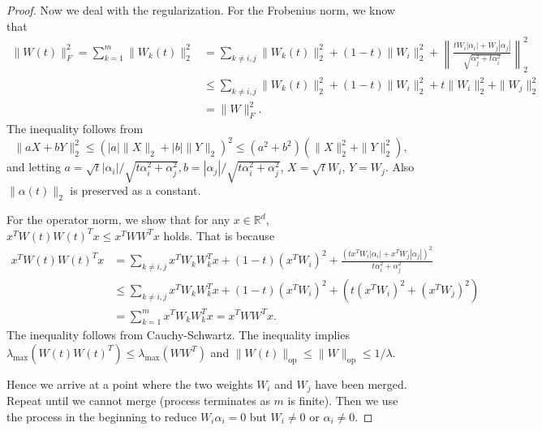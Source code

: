 \documentclass{article}
\newcommand{\op}{\mathrm{op}}
\begin{document}
\begin{proof}
Now we deal with the regularization. For the Frobenius norm, we know that
\begin{align*}
\|W(t)\|_F^2 = \sum_{k=1}^{m} \|W_k(t)\|_2^2 
&= \sum_{k\neq i,j} \|W_k(t)\|_2^2 + (1-t)\|W_i\|_2^2 + \left\|\frac{tW_i|\alpha_i|+W_j|\alpha_j|}{\sqrt{\alpha_j^2 + t\alpha_i^2}}\right\|_2^2 \\
&\leq \sum_{k \neq i,j} \|W_k(t)\|_2^2 + (1-t)\|W_i\|_2^2 + t\|W_i\|_2^2 + \|W_j\|_2^2\\
&= \|W\|_F^2.
\end{align*}
The inequality follows from
\[
\|aX+bY\|_2^2 \leq (|a|\|X\|_2 + |b|\|Y\|_2)^2 \leq (a^2+b^2)(\|X\|_2^2+\|Y\|_2^2),
\]
and letting $a = \sqrt{t}|\alpha_i|/\sqrt{t\alpha_i^2+\alpha_j^2}, b = |\alpha_j|/\sqrt{t\alpha_i^2+\alpha_j^2}$, $X = \sqrt{t}W_i$, $Y = W_j$. Also $\|\alpha(t)\|_2$ is preserved as a constant.

For the operator norm, we show that for any $x \in \mathbb{R}^{d}$, $x^{T}W(t)W(t)^{T}x \leq x^{T}WW^{T}x$ holds. That is because 
\begin{align*}
x^{T}W(t)W(t)^{T}x &= \sum_{k \neq i,j}x^{T}W_kW_k^{T}x + (1-t)(x^{T}W_i)^2 + \frac{(tx^{T}W_i|\alpha_i| + x^{T}W_j|\alpha_j|)^2}{t\alpha_i^2 + \alpha_j^2}\\
&\leq \sum_{k \neq i,j}x^{T}W_kW_k^{T}x + (1-t)(x^{T}W_i)^2 + (t(x^{T}W_i)^2 + (x^{T}W_j)^2)\\
&= \sum_{k=1}^{m} x^{T}W_kW_k^{T}x = x^{T}WW^{T}x.
\end{align*}
The inequality follows from Cauchy-Schwartz. The inequality implies $\lambda_{\max} (W(t)W(t)^{T}) \leq \lambda_{\max}(WW^{T})$ and $\| W(t)\|_{\op} \leq \|W\|_{\op} \leq 1/\lambda$.

Hence we arrive at a point where the two weights $W_i$ and $W_j$ have been merged. Repeat until we cannot merge (process terminates as $m$ is finite). Then we use the process in the beginning to reduce $W_i\alpha_i = 0$ but $W_i \neq 0$ or $\alpha_i \neq 0$.
\end{proof}
\end{document}
